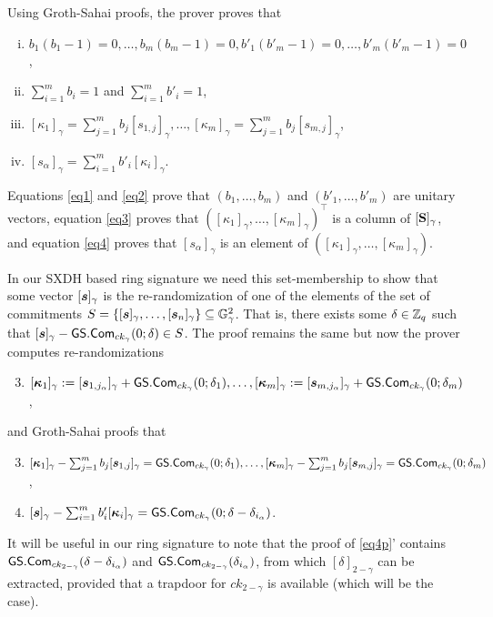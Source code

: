 Using Groth-Sahai proofs, the prover proves that
\begin{enumerate}[i.]
\item $b_1(b_1-1)=0,\ldots,b_m(b_m-1)=0,b'_1(b'_m-1)=0,\ldots,b'_m(b'_m-1)=0$,\label{eq1}
\item $\sum_{i=1}^m b_i =1$ and $\sum_{i=1}^m b'_i=1$,\label{eq2}
\item $[\kappa_1]_\gamma=\sum_{j=1}^m b_j [s_{1,j}]_\gamma,\ldots,[\kappa_m]_\gamma=\sum_{j=1}^m b_j[s_{m,j}]_\gamma$,\label{eq3}
\item $[s_\alpha]_\gamma=\sum_{i=1}^m b'_i[\kappa_i]_\gamma$.\label{eq4}
\end{enumerate}
Equations \ref{eq1} and \ref{eq2} prove that $(b_1,\ldots,b_m)$ and $(b'_1,\ldots,b'_m)$ are unitary vectors, equation \ref{eq3} proves that $([\kappa_1]_\gamma,\ldots,[\kappa_m]_\gamma)^\top$ is a column of $[\mathbf{{S}}]_\gamma$, and equation \ref{eq4} proves that $[s_\alpha]_\gamma$ is an element of $([\kappa_1]_\gamma,\ldots,[\kappa_m]_\gamma)$.

In our SXDH based ring signature we need this set-membership to show that some vector $[{\boldsymbol{s}}]_\gamma$ is the re-randomization of one of the elements of the set of commitments $S = \{[{\boldsymbol{s}}]_\gamma,\ldots,[{\boldsymbol{s}}_n]_\gamma\}\subseteq\mathbb{G}_\gamma^2$. That is, there exists some $\delta\in\mathbb{Z}_q$ such that $[{\boldsymbol{s}}]_\gamma-{\mathsf{GS}}.\mathsf{Com}_{ck_\gamma}(0;\delta)\in S$. The proof remains the same but now
the prover computes re-randomizations
\begin{enumerate}[1'.]
\setcounter{enumi}{2}
\item $[{\boldsymbol{\kappa}}_1]_\gamma:=[{\boldsymbol{s}}_{1,j_\alpha}]_\gamma+{\mathsf{GS}}.\mathsf{Com}_{ck_\gamma}(0;\delta_1),\ldots,[{\boldsymbol{\kappa}}_m]_\gamma:=[{\boldsymbol{s}}_{m,j_\alpha}]_\gamma+{\mathsf{GS}}.\mathsf{Com}_{ck_\gamma}(0;\delta_m)$,
\end{enumerate}
and Groth-Sahai proofs that
\begin{enumerate}[i'.]
\setcounter{enumi}{2}
\item $[{\boldsymbol{\kappa}}_1]_\gamma - \sum_{j=1}^m b_j [{\boldsymbol{s}}_{1,j}]_\gamma = {\mathsf{GS}}.\mathsf{Com}_{ck_\gamma}(0;\delta_1),\ldots,[{\boldsymbol{\kappa}}_m]_\gamma-\sum_{j=1}^m b_j[{\boldsymbol{s}}_{m,j}]_\gamma = {\mathsf{GS}}.\mathsf{Com}_{ck_\gamma}(0;\delta_m)$,\label{eq3p}
\item $[{\boldsymbol{s}}]_\gamma - \sum_{i=1}^m b'_i[{\boldsymbol{\kappa}}_i]_\gamma  = {\mathsf{GS}}.\mathsf{Com}_{ck_\gamma}(0;\delta-\delta_{i_\alpha})$.\label{eq4p}
\end{enumerate}
It will be useful in our ring signature to note that the proof of \ref{eq4p}' contains ${\mathsf{GS}}.\mathsf{Com}_{ck_{2-\gamma}}(\delta-\delta_{i_\alpha})$ and ${\mathsf{GS}}.\mathsf{Com}_{ck_{2-\gamma}}(\delta_{i_\alpha})$, from which $[\delta]_{2-\gamma}$ can be extracted, provided that a trapdoor for $ck_{2-\gamma}$ is available (which will be the case).